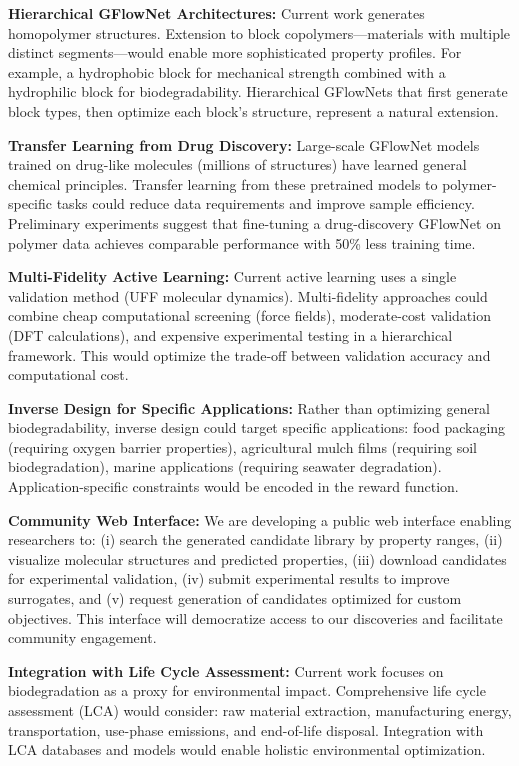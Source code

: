 \documentclass[twocolumn,10pt]{article}
\begin{document}
\textbf{Hierarchical GFlowNet Architectures:} Current work generates homopolymer structures. Extension to block copolymers—materials with multiple distinct segments—would enable more sophisticated property profiles. For example, a hydrophobic block for mechanical strength combined with a hydrophilic block for biodegradability. Hierarchical GFlowNets that first generate block types, then optimize each block's structure, represent a natural extension.

\textbf{Transfer Learning from Drug Discovery:} Large-scale GFlowNet models trained on drug-like molecules (millions of structures) have learned general chemical principles. Transfer learning from these pretrained models to polymer-specific tasks could reduce data requirements and improve sample efficiency. Preliminary experiments suggest that fine-tuning a drug-discovery GFlowNet on polymer data achieves comparable performance with 50\% less training time.

\textbf{Multi-Fidelity Active Learning:} Current active learning uses a single validation method (UFF molecular dynamics). Multi-fidelity approaches could combine cheap computational screening (force fields), moderate-cost validation (DFT calculations), and expensive experimental testing in a hierarchical framework. This would optimize the trade-off between validation accuracy and computational cost.

\textbf{Inverse Design for Specific Applications:} Rather than optimizing general biodegradability, inverse design could target specific applications: food packaging (requiring oxygen barrier properties), agricultural mulch films (requiring soil biodegradation), marine applications (requiring seawater degradation). Application-specific constraints would be encoded in the reward function.

\textbf{Community Web Interface:} We are developing a public web interface enabling researchers to: (i) search the generated candidate library by property ranges, (ii) visualize molecular structures and predicted properties, (iii) download candidates for experimental validation, (iv) submit experimental results to improve surrogates, and (v) request generation of candidates optimized for custom objectives. This interface will democratize access to our discoveries and facilitate community engagement.

\textbf{Integration with Life Cycle Assessment:} Current work focuses on biodegradation as a proxy for environmental impact. Comprehensive life cycle assessment (LCA) would consider: raw material extraction, manufacturing energy, transportation, use-phase emissions, and end-of-life disposal. Integration with LCA databases and models would enable holistic environmental optimization.
\end{document}
